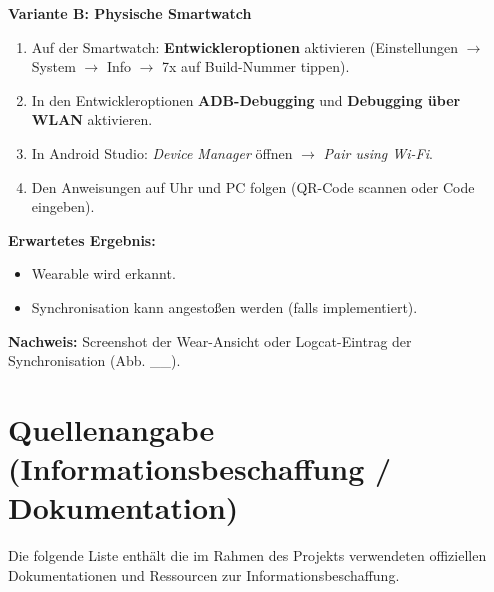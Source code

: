 \textbf{Variante B: Physische Smartwatch}
\begin{enumerate}
  \item Auf der Smartwatch: \textbf{Entwickleroptionen} aktivieren (Einstellungen $\rightarrow$ System $\rightarrow$ Info $\rightarrow$ 7x auf \glqq Build-Nummer\grqq{} tippen).
  \item In den Entwickleroptionen \textbf{ADB-Debugging} und \textbf{Debugging über WLAN} aktivieren.
  \item In Android Studio: \emph{Device Manager} öffnen $\rightarrow$ \emph{Pair using Wi-Fi}.
  \item Den Anweisungen auf Uhr und PC folgen (QR-Code scannen oder Code eingeben).
\end{enumerate}

\textbf{Erwartetes Ergebnis:}
\begin{itemize}
  \item Wearable wird erkannt.
  \item Synchronisation kann angestoßen werden (falls implementiert).
\end{itemize}

\textbf{Nachweis:} Screenshot der Wear-Ansicht oder Logcat-Eintrag der Synchronisation (Abb. \_\_).

\newpage
\section{Quellenangabe (Informationsbeschaffung / Dokumentation)}

Die folgende Liste enthält die im Rahmen des Projekts verwendeten offiziellen Dokumentationen und Ressourcen zur Informationsbeschaffung.

